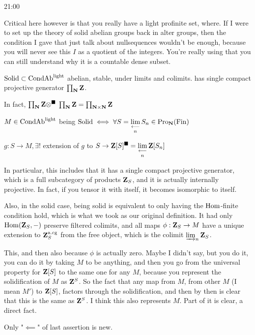 \begin{unfinished}{21:00}
\begin{sketch}
Critical here however is that you really have a light profinite set, where. If I were to set up the theory of solid abelian groups back in alter groups, then the condition I gave that just talk about nullsequences wouldn't be enough, because you will never see this $I$ as a quotient of the integers. 
You're really using that you can still understand why it is a countable dense subset.

\begin{theorem}
$\mathrm{Solid} \subset \mathrm{Cond}\mathrm{Ab}^{\mathrm{light}}$ abelian, stable, under limits and colimits.
has single compact projective generator $\prod_\mathbf N \mathbf Z$.

In fact, $\prod_\mathbf N \mathbf Z \otimes^\blacksquare$ $\prod_\mathbf N \mathbf Z = \prod_{\mathbf N \times \mathbf N} \mathbf Z$


$M \in \mathrm{Cond}\mathrm{Ab}^{\mathrm{light}}$ being $\mathrm{Solid} \iff  \forall S = \mathop{\operatorname*{lim}\limits_{\longleftarrow}}\limits_n S_n \in \operatorname{Pro}_\mathbf N(\operatorname{Fin})$

$g: S \to M, \exists!$ extension of $g$ to
$ S \to \mathbf Z[S]^\blacksquare = \mathop{\operatorname*{lim}\limits_{\longleftarrow}}\limits_n \mathbf Z[S_n]$

\end{theorem}

In particular, this includes that it has a single compact projective generator, which is a full subcategory of products $\mathbf Z_S$, and it is actually internally projective. In fact, if you tensor it with itself, it becomes isomorphic to itself.

Also, in the solid case, being solid is equivalent to only having the $\operatorname{Hom}$-finite condition hold, which is what we took as our original definition. It had only $\operatorname{Hom}(\mathbf Z_S,-)$ preserve filtered colimits, and all maps $\phi : \mathbf Z_S \to M$ have a unique extension to $\mathbf Z_S^{\mathrm{a.cg}}$ from the free object, which is the colimit $\varinjlim_n \mathbf Z_S$.

This, and then also because $\phi$ is actually zero. Maybe I didn't say, but you do it, you can do it by taking $M$ to be anything, and then you go from the universal property for $\mathbf Z[S]$ to the same one for any $M$, because you represent the solidification of $M$ as $\mathbf Z^S$. So the fact that any map from $M$, from other $M$ (I mean $M'$) to $\mathbf Z[S]$, factors through the solidification, and then by then is clear that this is the same as $\mathbf Z^S$. I think this also represents $M$. Part of it is clear, a direct fact.

\begin{sketch}
Only "$\impliedby$" of last assertion is new.


\end{sketch}
\end{sketch}
\end{unfinished}
